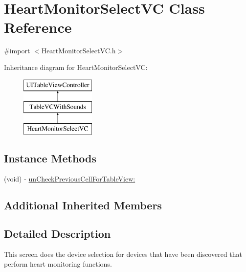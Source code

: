 \hypertarget{interface_heart_monitor_select_v_c}{\section{Heart\-Monitor\-Select\-V\-C Class Reference}
\label{interface_heart_monitor_select_v_c}
}


{\ttfamily \#import $<$Heart\-Monitor\-Select\-V\-C.\-h$>$}

Inheritance diagram for Heart\-Monitor\-Select\-V\-C\-:\begin{figure}[H]
\begin{center}
\leavevmode
\includegraphics[height=3.000000cm]{interface_heart_monitor_select_v_c}
\end{center}
\end{figure}
\subsection*{Instance Methods}
\begin{DoxyCompactItemize}
\item 
(void) -\/ \hyperlink{interface_heart_monitor_select_v_c_a418b4c4067095962e3800b9166caee05}{un\-Check\-Previous\-Cell\-For\-Table\-View\-:}
\end{DoxyCompactItemize}
\subsection*{Additional Inherited Members}


\subsection{Detailed Description}
This screen does the device selection for devices that have been discovered that perform heart monitoring functions. 

